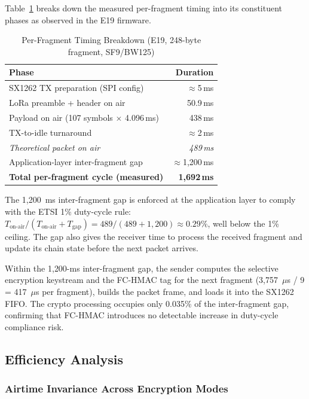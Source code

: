 \documentclass[journal]{IEEEtran}
\begin{document}
Table~\ref{tab:frag_timing} breaks down the measured per-fragment timing into
its constituent phases as observed in the E19 firmware.

\begin{table}[ht]
\centering
\caption{Per-Fragment Timing Breakdown (E19, 248-byte fragment, SF9/BW125)}
\label{tab:frag_timing}
\begin{tabular}{lr}
\toprule
Phase & Duration \\
\midrule
SX1262 TX preparation (SPI config) & $\approx$5\,ms \\
LoRa preamble + header on air & 50.9\,ms \\
Payload on air (107 symbols $\times$ 4.096\,ms) & 438\,ms \\
TX-to-idle turnaround & $\approx$2\,ms \\
\midrule
\textit{Theoretical packet on air} & \textit{489\,ms} \\
\midrule
Application-layer inter-fragment gap & $\approx$1{,}200\,ms \\
\textbf{Total per-fragment cycle (measured)} & \textbf{1{,}692\,ms} \\
\bottomrule
\end{tabular}
\end{table}

The 1{,}200~ms inter-fragment gap is enforced at the application layer to
comply with the ETSI 1\% duty-cycle rule: $T_{\text{on-air}} /
(T_{\text{on-air}} + T_{\text{gap}}) = 489 / (489 + 1{,}200) \approx 0.29\%$,
well below the 1\% ceiling.  The gap also gives the receiver time to process
the received fragment and update its chain state before the next packet arrives.

Within the 1{,}200-ms inter-fragment gap, the sender computes the selective
encryption keystream and the FC-HMAC tag for the next fragment (3{,}757~$\mu$s /
9 = 417~$\mu$s per fragment), builds the packet frame, and loads it into the
SX1262 FIFO.  The crypto processing occupies only 0.035\% of the inter-fragment
gap, confirming that FC-HMAC introduces no detectable increase in duty-cycle
compliance risk.

\subsection{Efficiency Analysis}
\label{sec:efficiency}

\subsubsection{Airtime Invariance Across Encryption Modes}
\end{document}
